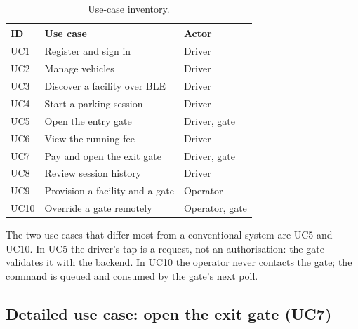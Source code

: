 \begin{table}[htbp]
  \centering
  \small
  \begin{tabularx}{\textwidth}{@{}lXl@{}}
    \toprule
    \textbf{ID} & \textbf{Use case} & \textbf{Actor} \\
    \midrule
    UC1 & Register and sign in & Driver \\
    UC2 & Manage vehicles & Driver \\
    UC3 & Discover a facility over BLE & Driver \\
    UC4 & Start a parking session & Driver \\
    UC5 & Open the entry gate & Driver, gate \\
    UC6 & View the running fee & Driver \\
    UC7 & Pay and open the exit gate & Driver, gate \\
    UC8 & Review session history & Driver \\
    UC9 & Provision a facility and a gate & Operator \\
    UC10 & Override a gate remotely & Operator, gate \\
    \bottomrule
  \end{tabularx}
  \caption{Use-case inventory.}
  \label{tab:use-cases}
\end{table}

The two use cases that differ most from a conventional system are UC5 and UC10. In
UC5 the driver's tap is a request, not an authorisation: the gate validates it with
the backend. In UC10 the operator never contacts the gate; the command is queued and
consumed by the gate's next poll.

\subsection*{Detailed use case: open the exit gate (UC7)}

